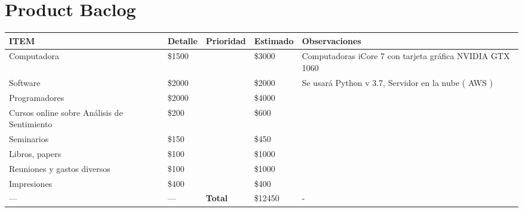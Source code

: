 \chapter{Product Baclog}

\begin{tabular}{ |p{2.5cm}|p{2.5cm}|p{2.5cm}|p{2.5cm}|p{5cm}| }
	\hline
	\rowcolor{gray!40}  \textbf{ITEM}         & \textbf{Detalle}      & \textbf{Prioridad} & \textbf{Estimado} & \textbf{Observaciones}   \\  \hline
	Computadora                        & \raggedleft \$1500  &\centering 2  &\raggedleft \$3000  &  Computadoras iCore 7 con tarjeta gr\'afica NVIDIA GTX 1060    \\   \hline
	Software                        & \raggedleft \$2000  &\centering 1  &\raggedleft \$2000  &  Se usar\'a Python v 3.7, Servidor en la nube ( AWS )    \\   \hline
	Programadores              & \raggedleft \$2000    & \centering 2  &\raggedleft \$4000   & \\   \hline
	Cursos online sobre An\'alisis de Sentimiento              &\raggedleft  \$200    &\centering 3  &\raggedleft  \$600   & \\   \hline
	Seminarios              & \raggedleft \$150    & \centering 3  &\raggedleft \$450   & \\   \hline
	Libros, papers              & \raggedleft \$100    & \centering 10  &\raggedleft \$1000   & \\   \hline
	Reuniones y gastos diversos              & \raggedleft \$100    & \centering 10  &\raggedleft \$1000   & \\   \hline
	Impresiones              & \raggedleft \$400    & \centering 1  &\raggedleft \$400   & \\   \hline
	\centering          ---           &   \centering   --- & \cellcolor{gray!40} \textbf{Total}   &\raggedleft \$12450   &  -  \\   \hline
\end{tabular}

